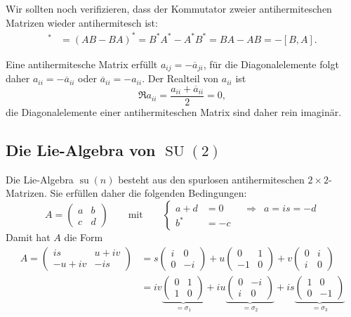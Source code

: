 Wir sollten noch verifizieren, dass der Kommutator zweier antihermiteschen
Matrizen wieder antihermitesch ist:
%
\begin{align*}
[A,B]^*
&=
(AB-BA)^*
=
B^*A^*-A^*B^*
=
BA - AB
=
-[B,A].
\end{align*}

Eine antihermitesche Matrix erfüllt $a_{i\!j}=-\overline{a}_{ji}$,
für die Diagonalelemente folgt daher $a_{ii} = -\overline{a}_{ii}$
oder $\overline{a}_{ii}=-a_{ii}$.
Der Realteil von $a_{ii}$ ist
\[
\Re a_{ii}
=
\frac{a_{ii}+\overline{a}_{ii}}2
=
0,
\]
die Diagonalelemente einer antihermiteschen Matrix sind daher rein
imaginär.


%
%
\subsection{Die Lie-Algebra von $\operatorname{SU}(2)$}
Die Lie-Algebra $\operatorname{su}(n)$ besteht aus den
spurlosen antihermiteschen $2\times 2$-Matrizen.
%
Sie erfüllen daher die folgenden Bedingungen:
\[
A=\begin{pmatrix}a&b\\c&d\end{pmatrix}
\qquad
\text{mit}
\qquad
\left\{
\begin{aligned}
a+d&=0&&\Rightarrow& a=is = -d
\\
b^*&=-c
\end{aligned}
\right.
\]
Damit hat $A$ die Form
\begin{align*}
A=\begin{pmatrix}
is&u+iv\\
-u+iv&-is
\end{pmatrix}
&=
s
\begin{pmatrix}
i&0\\
0&-i
\end{pmatrix}
+
u
\begin{pmatrix}
 0&1\\
-1&0
\end{pmatrix}
+
v
\begin{pmatrix}
0&i\\
i&0
\end{pmatrix}
\\
&=
iv\underbrace{\begin{pmatrix}0&1\\1&0\end{pmatrix}}_{\displaystyle=\sigma_1}
+
iu\underbrace{\begin{pmatrix}0&-i\\i&0\end{pmatrix}}_{\displaystyle=\sigma_2}
+
is\underbrace{\begin{pmatrix}1&0\\0&-1\end{pmatrix}}_{\displaystyle=\sigma_3}
\end{align*}
